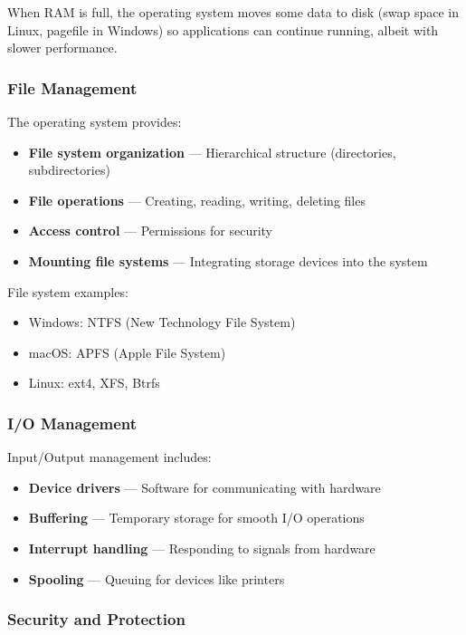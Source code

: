 \begin{examplebox}
When RAM is full, the operating system moves some data to disk (swap space in Linux, pagefile in Windows) so applications can continue running, albeit with slower performance.
\end{examplebox}

\subsubsection{File Management}

The operating system provides:
\begin{itemize}
    \item \textbf{File system organization} --- Hierarchical structure (directories, subdirectories)
    \item \textbf{File operations} --- Creating, reading, writing, deleting files
    \item \textbf{Access control} --- Permissions for security
    \item \textbf{Mounting file systems} --- Integrating storage devices into the system
\end{itemize}

File system examples:
\begin{itemize}
    \item Windows: NTFS (New Technology File System)
    \item macOS: APFS (Apple File System)
    \item Linux: ext4, XFS, Btrfs
\end{itemize}

\subsubsection{I/O Management}

Input/Output management includes:
\begin{itemize}
    \item \textbf{Device drivers} --- Software for communicating with hardware
    \item \textbf{Buffering} --- Temporary storage for smooth I/O operations
    \item \textbf{Interrupt handling} --- Responding to signals from hardware
    \item \textbf{Spooling} --- Queuing for devices like printers
\end{itemize}

\subsubsection{Security and Protection}

